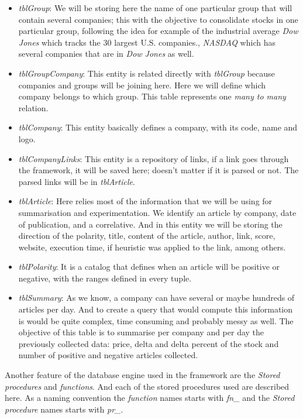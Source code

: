 \begin{itemize}
	\item \emph{tblGroup}: We will be storing here the name of one particular group that will contain several companies; this with the objective to consolidate stocks in one particular group, following the idea for example of the industrial average \emph{Dow Jones} which tracks the 30 largest U.S. companies., \emph{NASDAQ} which has several companies that are in \emph{Dow Jones} as well.
	\item \emph{tblGroupCompany}: This entity is related directly with \emph{tblGroup} because companies and groups will be joining here. Here we will define which company belongs to which group. This table represents one \emph{many to many} relation. 
	\item \emph{tblCompany}: This entity basically defines a company, with its code, name and logo.
	\item \emph{tblCompanyLinks}: This entity is a repository of links, if a link goes through the framework, it will be saved here; doesn't matter if it is parsed or not. The parsed links will be in \emph{tblArticle}.
	\item \emph{tblArticle}: Here relies most of the information that we will be using for summarisation and experimentation. We identify an article by company, date of publication, and a correlative. And in this entity we will be storing the direction of the polarity, title, content of the article, author, link, score, website, execution time, if heuristic was applied to the link, among others. 
	\item \emph{tblPolarity}: It is a catalog that defines when an article will be positive or negative, with the ranges defined in every tuple.
	\item \emph{tblSummary}: As we know, a company can have several or maybe hundreds of articles per day. And to create a query that would compute this information is would be quite complex, time consuming and probably messy as well. The objective of this table is to summarise per company and per day the previously collected data: price, delta and delta percent of the stock and number of positive and negative articles collected.
\end{itemize}

Another feature of the database engine used in the framework are the \emph{Stored procedures} and \emph{functions}. And each of the stored procedures used are described here. As a naming convention the \emph{function} names starts with \emph{fn\_} and the  \emph{Stored procedure} names starts with \emph{pr\_}.

